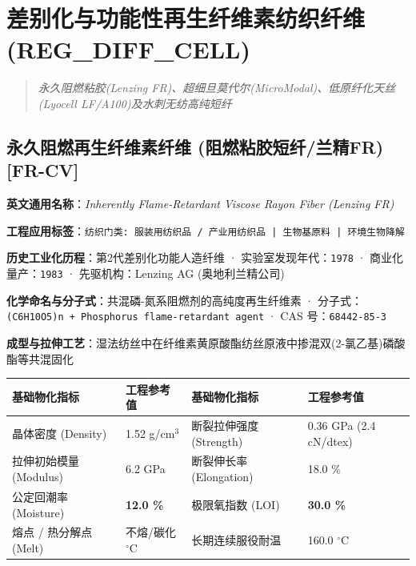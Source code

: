 \documentclass[11pt,openright,twoside,UTF8]{ctexbook}
\begin{document}
\chapter{差别化与功能性再生纤维素纺织纤维 (REG\_DIFF\_CELL)}
\begin{quote}
\small\itshape
永久阻燃粘胶(Lenzing FR)、超细旦莫代尔(MicroModal)、低原纤化天丝(Lyocell LF/A100)及水刺无纺高纯短纤
\end{quote}

\section{永久阻燃再生纤维素纤维 (阻燃粘胶短纤/兰精FR) [FR-CV]}
\label{sec:fr-cv}

\noindent\textbf{英文通用名称}：\textit{Inherently Flame-Retardant Viscose Rayon Fiber (Lenzing FR)}\par
\noindent\textbf{工程应用标签}：\texttt{纺织门类: 服装用纺织品 / 产业用纺织品 | 生物基原料 | 环境生物降解}\par
\noindent\textbf{历史工业化历程}：第2代差别化功能人造纤维 · 实验室发现年代：\texttt{1978} · 商业化量产：\texttt{1983} · 先驱机构：Lenzing AG (奥地利兰精公司)\par
\noindent\textbf{化学命名与分子式}：共混磷-氮系阻燃剂的高纯度再生纤维素 · 分子式：\texttt{(C6H10O5)n + Phosphorus flame-retardant agent} · CAS 号：\texttt{68442-85-3}\par
\noindent\textbf{成型与拉伸工艺}：湿法纺丝中在纤维素黄原酸酯纺丝原液中掺混双(2-氯乙基)磷酸酯等共混固化\par

\vspace{0.15cm}
\begin{center}
\small
\begin{tabularx}{\textwidth}{p{3.8cm}Xp{3.8cm}X}
\toprule
\textbf{基础物化指标} & \textbf{工程参考值} & \textbf{基础物化指标} & \textbf{工程参考值} \\
\midrule
晶体密度 (Density) & 1.52 g/cm$^3$ & 断裂拉伸强度 (Strength) & 0.36 GPa (2.4 cN/dtex) \\
拉伸初始模量 (Modulus) & 6.2 GPa & 断裂伸长率 (Elongation) & 18.0 \% \\
公定回潮率 (Moisture) & \textbf{12.0 \%} & 极限氧指数 (LOI) & \textbf{30.0 \%} \\
熔点 / 热分解点 (Melt) & 不熔/碳化 $^\circ\mathrm{C}$ & 长期连续服役耐温 & 160.0 $^\circ\mathrm{C}$ \\
\bottomrule
\end{tabularx}
\end{center}
\vspace{0.15cm}
\end{document}
